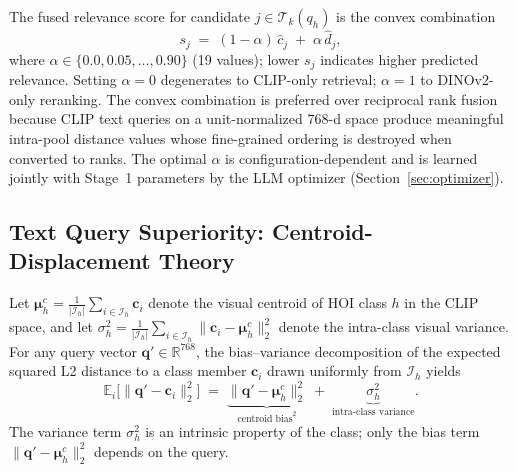 \documentclass[sigconf, nonacm]{acmart}
\theoremstyle{definition}
\begin{document}
The fused relevance score for candidate $j \in \mathcal{T}_k(q_h)$ is the
convex combination~\cite{bruch2024tois}
\begin{equation}
  s_j \;=\; (1-\alpha)\,\hat{c}_j \;+\; \alpha\,\hat{d}_j ,
  \label{eq:fusion}
\end{equation}
where $\alpha \in \{0.0, 0.05, \ldots, 0.90\}$ (19 values); lower $s_j$ indicates
higher predicted relevance.
Setting $\alpha{=}0$ degenerates to CLIP-only retrieval; $\alpha{=}1$ to
DINOv2-only reranking.
The convex combination is preferred over reciprocal rank fusion because CLIP text
queries on a unit-normalized 768-d space produce meaningful intra-pool distance values
whose fine-grained ordering is destroyed when converted to ranks.
The optimal $\alpha$ is configuration-dependent and is learned jointly with Stage~1
parameters by the LLM optimizer (Section~\ref{sec:optimizer}).

\subsection{Text Query Superiority: Centroid-Displacement Theory}
\label{sec:centroid}

Let $\boldsymbol{\mu}_h^c = \frac{1}{|\mathcal{I}_h|}\sum_{i\in\mathcal{I}_h}\mathbf{c}_i$
denote the visual centroid of HOI class $h$ in the CLIP space, and let
$\sigma_h^2 = \frac{1}{|\mathcal{I}_h|}\sum_{i \in \mathcal{I}_h}
\|\mathbf{c}_i - \boldsymbol{\mu}_h^c\|_2^2$ denote the intra-class visual variance.
For any query vector $\mathbf{q}' \in \mathbb{R}^{768}$, the bias--variance
decomposition of the expected squared L2 distance to a class member $\mathbf{c}_i$
drawn uniformly from $\mathcal{I}_h$ yields
\begin{equation}
  \mathbb{E}_{i}\bigl[\|\mathbf{q}' - \mathbf{c}_i\|_2^2\bigr]
  \;=\;
  \underbrace{\|\mathbf{q}' - \boldsymbol{\mu}_h^c\|_2^2}_{\text{centroid bias}^2}
  \;+\;
  \underbrace{\sigma_h^2}_{\text{intra-class variance}} .
  \label{eq:biasvar}
\end{equation}
The variance term $\sigma_h^2$ is an intrinsic property of the class; only the
bias term $\|\mathbf{q}' - \boldsymbol{\mu}_h^c\|_2^2$ depends on the query.
\end{document}
